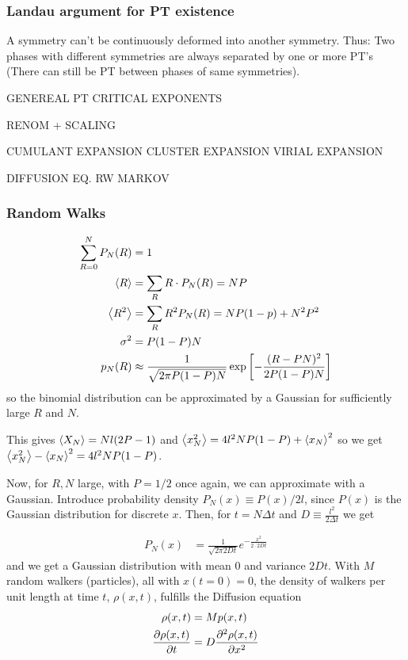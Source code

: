 \documentclass[a4paper, english, 12pt]{article}
\newcommand{\bracket}[1]{\left[ #1 \right]}
\begin{document}
\begin{multicols*}{2}
\subsubsection*{\tiny Landau argument for PT existence}
A symmetry can't be continuously deformed into another symmetry. Thus: Two phases with different symmetries are always separated by one or more PT's (There can still be PT between phases of same symmetries).




GENEREAL PT 
CRITICAL EXPONENTS 

RENOM + SCALING 


CUMULANT EXPANSION 
CLUSTER EXPANSION 
VIRIAL EXPANSION 


DIFFUSION EQ. RW
MARKOV 


\subsubsection*{\scriptsize Random Walks}

\begin{align*}
    \sum_{R=0}^N P_N(R) &= 1 \\ 
    \expval{R} &= \sum_R R\cdot P_N(R)=NP \\ 
    \expval{R^2} &= \sum_R R^2 P_N(R) = NP(1-p) + N^2 P^2 \\
    \sigma^2 &= P(1-P)N \\ 
    p_N(R) &\approx \frac{1}{\sqrt{2\pi P(1-P)N}}\exp\bracket{-\frac{(R-PN)^2}{2P(1-P)N}}
\end{align*}
so the binomial distribution can be approximated by a Gaussian for sufficiently large $R$ and $N$. 

This gives $\expval{X_N}=Nl(2P-1)$ and $\expval{x_N^2}=4l^2 NP(1-P) + \expval{x_N}^2$ so we get $\expval{x_N^2} - \expval{x_N}^2 = 4l^2 N P(1-P)$.

Now, for $R,N$ large, with $P=1/2$ once again, we can approximate with a Gaussian. Introduce probability density $P_N(x)\equiv P(x)/2l$, since $P(x)$ is the Gaussian distribution for discrete $x$. Then, for $t=N\Delta t$ and $D\equiv \frac{l^2}{2\Delta t}$ we get 

\begin{align*}
    P_N(x) &= \frac{1}{\sqrt{2\pi 2Dt}} e^{-\frac{x^2}{2\cdot 2Dt}}
\end{align*}
and we get a Gaussian distribution with mean $0$ and variance $2Dt$. With $M$ random walkers (particles), all with $x(t=0)=0$, the density of walkers per unit length at time $t$, $\rho(x,t)$, fulfills the Diffusion equation 
\begin{align*}
    \rho(x,t) &= M p(x,t) \\ 
    \pdv{\rho(x,t)}{t} &= D \pdv[2]{\rho(x,t)}{x}
\end{align*}



\end{multicols*}
\end{document}
